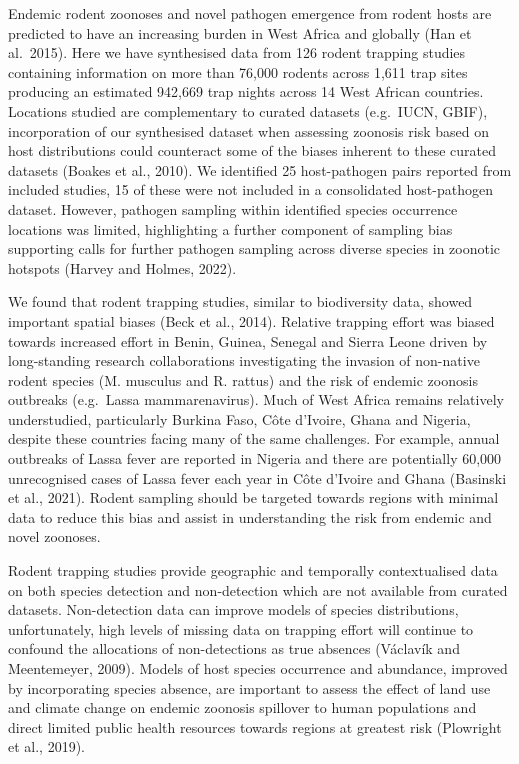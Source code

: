 \documentclass[
]{article}
\begin{document}
Endemic rodent zoonoses and novel pathogen emergence from rodent hosts
are predicted to have an increasing burden in West Africa and globally
(Han et al.~2015). Here we have synthesised data from 126 rodent
trapping studies containing information on more than 76,000 rodents
across 1,611 trap sites producing an estimated 942,669 trap nights
across 14 West African countries. Locations studied are complementary to
curated datasets (e.g.~IUCN, GBIF), incorporation of our synthesised
dataset when assessing zoonosis risk based on host distributions could
counteract some of the biases inherent to these curated datasets (Boakes
et al., 2010). We identified 25 host-pathogen pairs reported from
included studies, 15 of these were not included in a consolidated
host-pathogen dataset. However, pathogen sampling within identified
species occurrence locations was limited, highlighting a further
component of sampling bias supporting calls for further pathogen
sampling across diverse species in zoonotic hotspots (Harvey and Holmes,
2022).

We found that rodent trapping studies, similar to biodiversity data,
showed important spatial biases (Beck et al., 2014). Relative trapping
effort was biased towards increased effort in Benin, Guinea, Senegal and
Sierra Leone driven by long-standing research collaborations
investigating the invasion of non-native rodent species (M. musculus and
R. rattus) and the risk of endemic zoonosis outbreaks (e.g.~Lassa
mammarenavirus). Much of West Africa remains relatively understudied,
particularly Burkina Faso, Côte d'Ivoire, Ghana and Nigeria, despite
these countries facing many of the same challenges. For example, annual
outbreaks of Lassa fever are reported in Nigeria and there are
potentially 60,000 unrecognised cases of Lassa fever each year in Côte
d'Ivoire and Ghana (Basinski et al., 2021). Rodent sampling should be
targeted towards regions with minimal data to reduce this bias and
assist in understanding the risk from endemic and novel zoonoses.

Rodent trapping studies provide geographic and temporally contextualised
data on both species detection and non-detection which are not available
from curated datasets. Non-detection data can improve models of species
distributions, unfortunately, high levels of missing data on trapping
effort will continue to confound the allocations of non-detections as
true absences (Václavík and Meentemeyer, 2009). Models of host species
occurrence and abundance, improved by incorporating species absence, are
important to assess the effect of land use and climate change on endemic
zoonosis spillover to human populations and direct limited public health
resources towards regions at greatest risk (Plowright et al., 2019).
\end{document}
